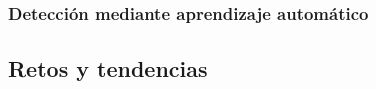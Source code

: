 \subsubsection{Detección mediante aprendizaje automático}
\label{subsubsec:ml}


\subsection{Retos y tendencias}
\label{subsec:retos_tendencias}


